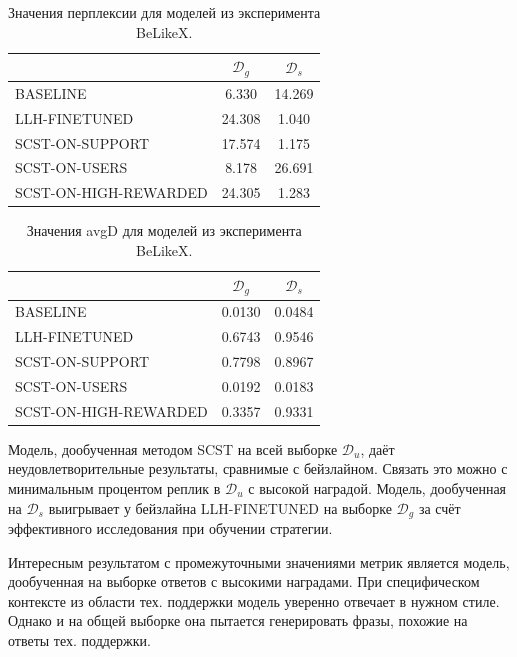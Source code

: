 \documentclass[12pt,a4paper]{amsart}
\begin{document}
\begingroup
\renewcommand{\arraystretch}{1.8}
\begin{table}
	\centering
	\begin{tabular}{|l|c|c|}
		\hline
		& $\mathcal{D}_g$                   &   $\mathcal{D}_s$ \\
		\hline 
		BASELINE & 6.330 & 14.269 \\ 
		\hline
		LLH-FINETUNED & 24.308 & 1.040 \\
		\hline 
		SCST-ON-SUPPORT & 17.574 & 1.175 \\
		\hline
		SCST-ON-USERS & 8.178 & 26.691 \\
		\hline
		SCST-ON-HIGH-REWARDED & 24.305 & 1.283 \\
		\hline
	\end{tabular}
	\caption{Значения перплексии для моделей из эксперимента BeLikeX.}
	\label{table:belikex-ppl}
\end{table}
\endgroup

\begingroup
\renewcommand{\arraystretch}{1.8}
\begin{table}
	\centering
	\begin{tabular}{|l|c|c|}
		\hline
		& $\mathcal{D}_g$                   &   $\mathcal{D}_s$ \\
		\hline 
		BASELINE & 0.0130 & 0.0484 \\ 
		\hline
		LLH-FINETUNED & 0.6743 & 0.9546 \\
		\hline 
		SCST-ON-SUPPORT & 0.7798 & 0.8967 \\
		\hline
		SCST-ON-USERS & 0.0192 & 0.0183 \\
		\hline
		SCST-ON-HIGH-REWARDED & 0.3357 & 0.9331 \\
		\hline
	\end{tabular}
	\caption{Значения avgD для моделей из эксперимента BeLikeX.}
	\label{table:belikex-dssm-score}
\end{table}
\endgroup


Модель, дообученная методом SCST на всей выборке $\mathcal{D}_u$, даёт неудовлетворительные результаты, сравнимые с бейзлайном. Связать это можно с минимальным процентом реплик в $\mathcal{D}_u$ с высокой наградой. Модель, дообученная на $\mathcal{D}_s$ выигрывает у бейзлайна LLH-FINETUNED на выборке $\mathcal{D}_g$ за счёт эффективного исследования при обучении стратегии.

Интересным результатом с промежуточными значениями метрик является модель, дообученная на выборке ответов с высокими наградами. При специфическом контексте из области тех. поддержки модель уверенно отвечает в нужном стиле. Однако и на общей выборке она пытается генерировать фразы, похожие на ответы тех. поддержки.
\end{document}
